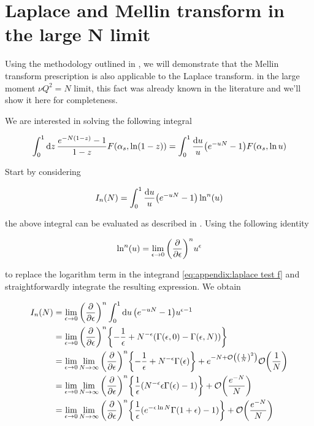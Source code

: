 \documentclass[../main.tex]{subfiles}
\begin{document}
\section{Laplace and Mellin transform in the large N limit} \label{Appendix: Laplace and Mellin transform}

Using the methodology outlined in \cite{Catani_2003_appendix}, we will demonstrate that the Mellin transform prescription is also applicable to the Laplace transform.
in the large moment $\nu Q^2 = N$ limit, this fact was already known in the literature \cite{CATAN_large_chi} and we'll show it here for completeness.

We are interested in solving the following integral

\begin{equation}
    \int_0^1 \dd{z} \frac{e^{- N (1-z)} - 1}{1-z} F\qty(\alpha_s,\ln(1-z))= \int_0^1 \frac{\dd{u}}{u} \qty(e^{-u N} - 1) F\qty(\alpha_s , \ln u)
\end{equation}

Start by considering 

\begin{equation}\label{eq:appendix:laplace test f}
    I_n(N) = \int_0^1 \frac{\dd{u}}{u} \qty(e^{-u N} - 1) \ln^n(u) 
\end{equation}

the above integral can be evaluated as described in \cite{CATANI1989323}. Using the following identity

\begin{equation}
    \ln^n(u)= \lim_{\epsilon \to 0} \qty(\pdv{\epsilon})^n u^\epsilon
\end{equation}

to replace the logarithm term in the integrand \cref{eq:appendix:laplace test f} and straightforwardly integrate the resulting expression. We obtain

\begin{align}
    \begin{split}\label{eq:appendix:calculation}
    I_n(N) &= \lim_{\epsilon \to 0} \qty(\pdv{\epsilon})^n \int_0^1 \dd{u} \qty(e^{-u N} - 1) u^{\epsilon-1} \\
    &= \lim_{\epsilon \to 0} \qty(\pdv{\epsilon})^n \qty{-\frac{1}{\epsilon}+N^{-\epsilon} (\Gamma(\epsilon,0) - \Gamma(\epsilon,N))} \\
    &= \lim_{\epsilon \to 0} \lim_{N \to \infty} \qty(\pdv{\epsilon})^n \qty{-\frac{1}{\epsilon}+N^{-\epsilon} \Gamma(\epsilon)}+ e^{-N + \order{\qty(\frac{1}{N})^2}}\order{\frac{1}{N}} \\
    &= \lim_{\epsilon \to 0} \lim_{N \to \infty} \qty(\pdv{\epsilon})^n \qty{\frac{1}{\epsilon} (N^{-\epsilon} \epsilon \Gamma(\epsilon) -1)} + \order{\frac{e^{-N}}{N}}\\
    &= \lim_{\epsilon \to 0} \lim_{N \to \infty} \qty(\pdv{\epsilon})^n \qty{\frac{1}{\epsilon} ( e^{-\epsilon \ln N} \Gamma(1+\epsilon) -1)} + \order{\frac{e^{-N}}{N}}
    \end{split}
\end{align}
\end{document}
